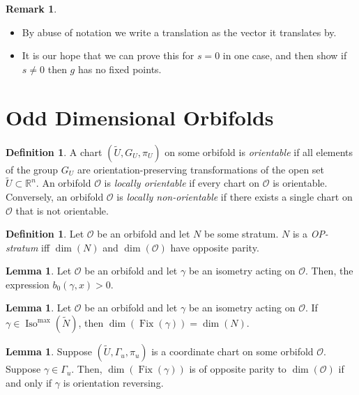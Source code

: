\documentclass[12pt]{article}
\theoremstyle{definition}
\newtheorem{remark}[theorem]{Remark}
\newtheorem{lemma}[theorem]{Lemma}
\newtheorem{definition}[theorem]{Definition}
\DeclareMathOperator{\iso}{Iso}
\DeclareMathOperator{\fix}{Fix}
\newcommand{\orb}{\mathcal O}
\begin{document}
\begin{remark}  
\begin{itemize}
\item By abuse of notation we write a translation as the vector it translates by.
\item It is our hope that we can prove this for $s=0$ in one case, and then show if $s \neq 0$ then $g$ has no fixed points.
\end{itemize}
\end{remark}

\section{Odd Dimensional Orbifolds}

\begin{definition}
    A chart $(\tilde{U},G_U,\pi_U)$ on some orbifold is \emph{orientable} if all elements of the group $G_U$ are orientation-preserving transformations of the open set $\tilde{U} \subset \mathbb{R}^n$. An orbifold $\mathcal{O}$ is \emph{locally orientable} if every chart on $\mathcal{O}$ is orientable. Conversely, an orbifold $\mathcal{O}$ is \emph{locally non-orientable} if there exists a single chart on $\mathcal{O}$ that is not orientable.
\end{definition}

\begin{definition}
    Let $\mathcal{O}$ be an orbifold and let $N$ be some stratum. $N$ is a \emph{OP-stratum} iff $\dim(N)$ and $\dim(\mathcal{O})$ have opposite parity.
\end{definition}

\begin{lemma}
    Let $\mathcal{O}$ be an orbifold and let $\gamma$ be an isometry acting on $\mathcal{O}$. Then, the expression $b_0(\gamma,x) > 0$.
    \label{lem:b_0}
\end{lemma}

\begin{lemma} \label{lem:dim_of_fix}
    Let $\mathcal{O}$ be an orbifold and let $\gamma$ be an isometry acting on $\mathcal{O}$. If $\gamma \in \iso^{\max}(\tilde{N})$, then $\dim(\fix(\gamma)) = \dim(N)$.
\end{lemma}

\begin{lemma} \label{lem:dim-of-ori-rev}
    Suppose $(\tilde{U},\Gamma_u,\pi_u)$ is a coordinate chart on some orbifold $\orb$. Suppose $\gamma \in \Gamma_u$. Then, $\dim(\fix(\gamma))$ is of opposite parity to $\dim(\mathcal{O})$ if and only if $\gamma$ is orientation reversing.
    \label{lem:ori-rev-op}
\end{lemma}
\end{document}
